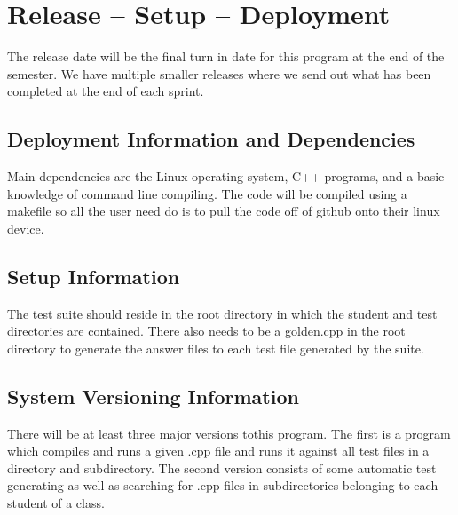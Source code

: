 
\chapter{Release -- Setup -- Deployment}
The release date will be the final turn in date for this program at the end of the semester. We have multiple smaller releases where we send out what has been completed at the end of each sprint. 


\section{Deployment Information and Dependencies}
Main dependencies are the Linux operating system, C++ programs, and a basic knowledge of command line compiling. The code will be compiled using a makefile so all the user need do is to pull the code off of github onto their linux device. 



\section{Setup Information}
The test suite should reside in the root directory in which the student and test directories are contained. There also needs to be a golden.cpp in the root directory to generate the answer files to each test file generated by the suite.



\section{System  Versioning Information}
There will be at least three major versions tothis program. The first is a program which compiles and runs a given .cpp file and runs it against all test files in a directory and subdirectory.
The second version consists of some automatic test generating as well as searching for .cpp files in subdirectories belonging to each student of a class.
